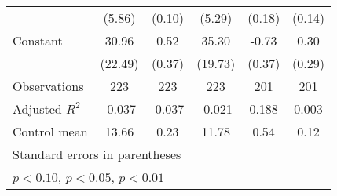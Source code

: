 \begin{table}[htbp]
\begin{tabular}{l*{5}{c}}
                &   (5.86)         &   (0.10)         &   (5.29)         &   (0.18)         &   (0.14)         \\
\addlinespace
Constant        &    30.96         &     0.52         &    35.30\sym{*}  &    -0.73\sym{*}  &     0.30         \\
                &  (22.49)         &   (0.37)         &  (19.73)         &   (0.37)         &   (0.29)         \\
\midrule
Observations    &      223         &      223         &      223         &      201         &      201         \\
Adjusted \(R^{2}\)&   -0.037         &   -0.037         &   -0.021         &    0.188         &    0.003         \\
Control mean    &    13.66         &     0.23         &    11.78         &     0.54         &     0.12         \\
\bottomrule
\multicolumn{6}{l}{\footnotesize Standard errors in parentheses}\\
\multicolumn{6}{l}{\footnotesize \sym{*} \(p<0.10\), \sym{**} \(p<0.05\), \sym{***} \(p<0.01\)}\\
\end{tabular}
\end{table}


